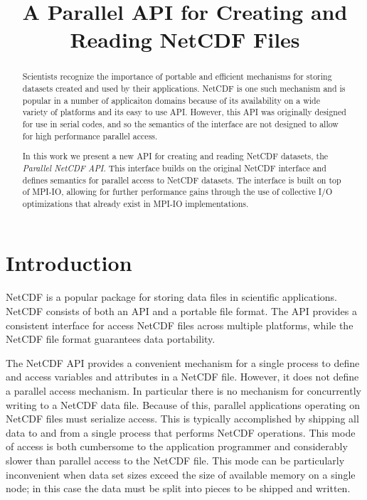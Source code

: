 \documentclass[10pt]{article}
\title{A Parallel API for Creating and Reading NetCDF Files}
\begin{document}
\maketitle

\begin{abstract}
Scientists recognize the importance of portable and efficient mechanisms for
storing datasets created and used by their applications.  NetCDF is one such
mechanism and is popular in a number of applicaiton domains because of its
availability on a wide variety of platforms and its easy to use API.  However,
this API was originally designed for use in serial codes, and so the semantics
of the interface are not designed to allow for high performance parallel
access.

In this work we present a new API for creating and reading NetCDF datasets,
the \emph{Parallel NetCDF API}.  This interface builds on the original NetCDF
interface and defines semantics for parallel access to NetCDF datasets.  The
interface is built on top of MPI-IO, allowing for further performance gains
through the use of collective I/O optimizations that already exist in MPI-IO
implementations.

\end{abstract}

\section{Introduction}

NetCDF is a popular package for storing data files in scientific applications.
NetCDF consists of both an API and a portable file format.  The API provides a
consistent interface for access NetCDF files across multiple platforms, while
the NetCDF file format guarantees data portability.

The NetCDF API provides a convenient mechanism for a single process to define
and access variables and attributes in a NetCDF file.  However, it does not
define a parallel access mechanism.  In particular there is no mechanism for
concurrently writing to a NetCDF data file.  Because of this, parallel
applications operating on NetCDF files must serialize access.  This is
typically accomplished by shipping all data to and from a single process that
performs NetCDF operations.  This mode of access is both cumbersome to the
application programmer and considerably slower than parallel access to the
NetCDF file.  This mode can be particularly inconvenient when data set sizes
exceed the size of available memory on a single node; in this case the data
must be split into pieces to be shipped and written.
\end{document}
